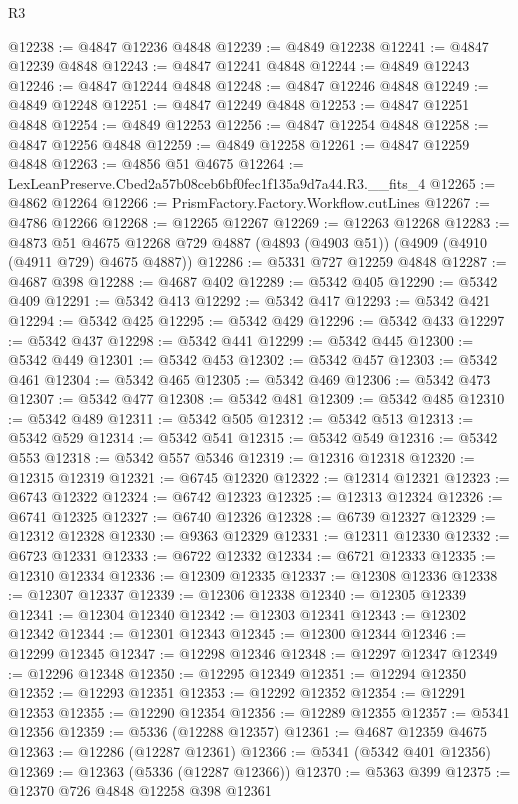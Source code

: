 \begin{lexlean}{R3}
\begin{coremodule}
@12238 := @4847 @12236 @4848
@12239 := @4849 @12238
@12241 := @4847 @12239 @4848
@12243 := @4847 @12241 @4848
@12244 := @4849 @12243
@12246 := @4847 @12244 @4848
@12248 := @4847 @12246 @4848
@12249 := @4849 @12248
@12251 := @4847 @12249 @4848
@12253 := @4847 @12251 @4848
@12254 := @4849 @12253
@12256 := @4847 @12254 @4848
@12258 := @4847 @12256 @4848
@12259 := @4849 @12258
@12261 := @4847 @12259 @4848
@12263 := @4856 @51 @4675
@12264 := LexLeanPreserve.Cbed2a57b08ceb6bf0fec1f135a9d7a44.R3.__fits_4
@12265 := @4862 @12264
@12266 := PrismFactory.Factory.Workflow.cutLines
@12267 := @4786 @12266
@12268 := @12265 @12267
@12269 := @12263 @12268
@12283 := @4873
    @51
    @4675
    @12268
    @729
    @4887
    (@4893 (@4903 @51))
    (@4909 (@4910 (@4911 @729) @4675 @4887))
@12286 := @5331 @727 @12259 @4848
@12287 := @4687 @398
@12288 := @4687 @402
@12289 := @5342 @405
@12290 := @5342 @409
@12291 := @5342 @413
@12292 := @5342 @417
@12293 := @5342 @421
@12294 := @5342 @425
@12295 := @5342 @429
@12296 := @5342 @433
@12297 := @5342 @437
@12298 := @5342 @441
@12299 := @5342 @445
@12300 := @5342 @449
@12301 := @5342 @453
@12302 := @5342 @457
@12303 := @5342 @461
@12304 := @5342 @465
@12305 := @5342 @469
@12306 := @5342 @473
@12307 := @5342 @477
@12308 := @5342 @481
@12309 := @5342 @485
@12310 := @5342 @489
@12311 := @5342 @505
@12312 := @5342 @513
@12313 := @5342 @529
@12314 := @5342 @541
@12315 := @5342 @549
@12316 := @5342 @553
@12318 := @5342 @557 @5346
@12319 := @12316 @12318
@12320 := @12315 @12319
@12321 := @6745 @12320
@12322 := @12314 @12321
@12323 := @6743 @12322
@12324 := @6742 @12323
@12325 := @12313 @12324
@12326 := @6741 @12325
@12327 := @6740 @12326
@12328 := @6739 @12327
@12329 := @12312 @12328
@12330 := @9363 @12329
@12331 := @12311 @12330
@12332 := @6723 @12331
@12333 := @6722 @12332
@12334 := @6721 @12333
@12335 := @12310 @12334
@12336 := @12309 @12335
@12337 := @12308 @12336
@12338 := @12307 @12337
@12339 := @12306 @12338
@12340 := @12305 @12339
@12341 := @12304 @12340
@12342 := @12303 @12341
@12343 := @12302 @12342
@12344 := @12301 @12343
@12345 := @12300 @12344
@12346 := @12299 @12345
@12347 := @12298 @12346
@12348 := @12297 @12347
@12349 := @12296 @12348
@12350 := @12295 @12349
@12351 := @12294 @12350
@12352 := @12293 @12351
@12353 := @12292 @12352
@12354 := @12291 @12353
@12355 := @12290 @12354
@12356 := @12289 @12355
@12357 := @5341 @12356
@12359 := @5336 (@12288 @12357)
@12361 := @4687 @12359 @4675
@12363 := @12286 (@12287 @12361)
@12366 := @5341 (@5342 @401 @12356)
@12369 := @12363 (@5336 (@12287 @12366))
@12370 := @5363 @399
@12375 := @12370 @726 @4848 @12258 @398 @12361

\end{coremodule}
\end{lexlean}
